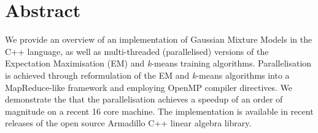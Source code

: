 \section*{Abstract}

We provide an overview of an implementation of Gaussian Mixture Models in the C++ language,
as well as multi-threaded (parallelised) versions of the Expectation Maximisation (EM) and {\it k}-means training algorithms.
Parallelisation is achieved through reformulation of the EM and {\it k}-means algorithms into a MapReduce-like framework
and employing OpenMP compiler directives.
We demonstrate the that the parallelisation achieves a speedup of an order of magnitude on a recent 16 core machine.
The implementation is available in recent releases of the open source Armadillo C++ linear algebra library.

